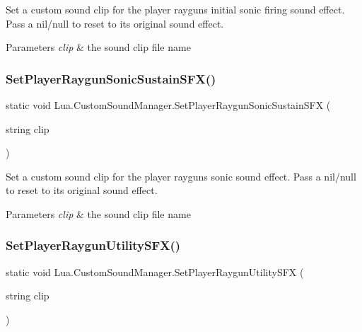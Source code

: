 Set a custom sound clip for the player raygun\textquotesingle{}s initial sonic firing sound effect. Pass a nil/null to reset to its original sound effect. 


\begin{DoxyParams}{Parameters}
{\em clip} & the sound clip file name\\
\hline
\end{DoxyParams}
\mbox{\label{class_lua_1_1_custom_sound_manager_a09ff65bfa0a9c0144771c73edcc3643a}} 
\subsubsection{\texorpdfstring{SetPlayerRaygunSonicSustainSFX()}{SetPlayerRaygunSonicSustainSFX()}}
{\footnotesize\ttfamily static void Lua.\+Custom\+Sound\+Manager.\+Set\+Player\+Raygun\+Sonic\+Sustain\+S\+FX (\begin{DoxyParamCaption}\item[{string}]{clip }\end{DoxyParamCaption})\hspace{0.3cm}{\ttfamily [static]}}



Set a custom sound clip for the player raygun\textquotesingle{}s sonic sound effect. Pass a nil/null to reset to its original sound effect. 


\begin{DoxyParams}{Parameters}
{\em clip} & the sound clip file name\\
\hline
\end{DoxyParams}
\mbox{\label{class_lua_1_1_custom_sound_manager_aa79c6dbaef8130988fcdebb2437cb36e}} 
\subsubsection{\texorpdfstring{SetPlayerRaygunUtilitySFX()}{SetPlayerRaygunUtilitySFX()}}
{\footnotesize\ttfamily static void Lua.\+Custom\+Sound\+Manager.\+Set\+Player\+Raygun\+Utility\+S\+FX (\begin{DoxyParamCaption}\item[{string}]{clip }\end{DoxyParamCaption})\hspace{0.3cm}{\ttfamily [static]}}



